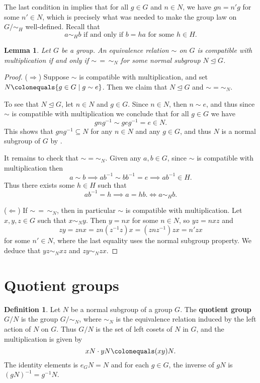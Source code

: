 \documentclass[12pt]{report}
\newtheorem{lemma}[theorem]{Lemma}
\numberwithin{equation}{section}
\numberwithin{theorem}{chapter}
\theoremstyle{definition}
\newtheorem{definition}[theorem]{Definition}
\newtheorem*{basic properties}{Basic Properties}
\newtheorem*{Important Remark}{Important Remark}
\newcommand{\df}[1]{{\bf #1}\index{#1}}
\begin{document}
The last condition in  implies that for all $g \in G$ and $n \in N$, we have $gn = n'g$ for some $n' \in N$, which is precisely what was needed to make the group law on $G/\sim_H$ well-defined. Recall that
$$a \sim_H b \textrm{ if and only if } b = ha \text{ for some } h \in H.$$ 



\begin{lemma} 
Let $G$ be a group. An equivalence relation $\sim$ on $G$ is compatible with multiplication if and only if $\sim \,=  \,\sim_N$ for some normal subgroup $N \trianglelefteq G$.
\end{lemma}

\begin{proof}
($\Rightarrow$) Suppose $\sim$ is compatible with multiplication, and set $N \colonequals \{g \in G \mid g \sim e\}$. Then we claim that $N\trianglelefteq G$ and $\sim=\sim_N$.

To see that $N\trianglelefteq G$, let $n\in N$ and $g\in G$. Since $n\in N$, then $n \sim e$, and thus since $\sim$ is compatible with multiplication we conclude that for all $g \in G$ we have
$$gng^{-1}\sim geg^{-1} = e \in N.$$ 
This shows that $gng^{-1} \subseteq N$ for any $n \in N$ and any $g\in G$, and thus $N$ is a normal subgroup of $G$ by .

It remains to check that $\sim=\sim_N$. Given any $a, b \in G$, since $\sim$ is compatible with multiplication then
$$a \sim b \implies ab^{-1} \sim bb^{-1} = e \implies ab^{-1} \in H.$$
Thus there exists some $h \in H$ such that
$$ab^{-1} = h \implies a = hb. \iff a \sim_H b.$$

($\Leftarrow$) If $\sim \,=  \,\sim_N$, then in particular $\sim$ is compatible with multiplication. Let $x,y,z\in G$ such that $x\sim_N y$. Then $y=nx$ for some $n\in N$, so $yz=nxz$ and $$zy=znx=zn(z^{-1}z)x=(znz^{-1})zx=n'zx$$ 
 for some $n'\in N$, where the last equality uses the normal subgroup property. We deduce that $yz\sim_N xz$ and $zy\sim_N zx$.
\end{proof}


\section{Quotient groups}


\begin{definition}\label{$G/N$}
Let $N$ be a normal subgroup of a group $G$. The \df{quotient group} $G/N$ is the group $G/\sim_N$, where $\sim_N$ is the equivalence relation induced by the left action of $N$ on $G$. Thus $G/N$ is the set of left cosets of $N$ in $G$, and the multiplication is given by 
$$xN\cdot yN \colonequals (xy)N.$$ 
The identity elements is $e_GN = N$ and for each $g \in G$, the inverse of $gN$ is $(gN)^{-1} = g^{-1}N$.
\end{definition}
\end{document}
